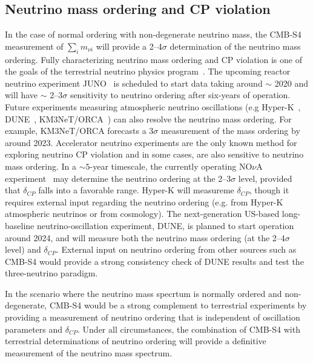 \subsection{Neutrino mass ordering and CP violation}
In the case of normal ordering with non-degenerate neutrino mass, the CMB-S4 measurement of $\sum_i m_{\nu i}$ will provide a 2--4$\sigma$ determination of the neutrino mass ordering. Fully characterizing neutrino mass ordering and CP violation is one of the goals of the terrestrial neutrino physics program~\cite{Patterson:2015xja}. The upcoming reactor neutrino experiment JUNO~\cite{An:2015jdp} is scheduled to start data taking around $\sim$ 2020 and will have $\sim$ 2--3$\sigma$ sensitivity to neutrino ordering after six-years of operation. Future experiments measuring atmospheric neutrino oscillations (e.g Hyper-K~\cite{Abe:2015zbg}, DUNE~\cite{Goodman:2015gmv}, KM3NeT/ORCA~\cite{Adrian-Martinez:2016fdl}) can also resolve the neutrino mass ordering. For example, KM3NeT/ORCA forecasts a 3$\sigma$ measurement of the mass ordering by around 2023. Accelerator neutrino experiments are the only known method for exploring neutrino CP violation and in some cases, are also sensitive to neutrino mass ordering. In a $\sim 5$-year timescale, the currently operating NO$\nu$A experiment~\cite{Adamson:2016tbq} may determine the neutrino ordering at the 2--3$\sigma$ level, provided that $\delta_{CP}$ falls into a favorable range. Hyper-K will measureme $\delta_{CP}$, though it requires external input regarding the neutrino ordering (e.g. from Hyper-K atmospheric neutrinos or from cosmology). The next-generation US-based long-baseline neutrino-oscillation experiment, DUNE, is planned to start operation around 2024, and will measure both the neutrino mass ordering (at the 2--4$\sigma$ level) and $\delta_{CP}$. External input on neutrino ordering from other sources such as CMB-S4 would provide a strong consistency check of DUNE results and test the three-neutrino paradigm.

In the scenario where the neutrino mass specrtum is normally ordered and non-degenerate, CMB-S4 would be a strong complement to terrestrial experiments by providing a measurement of neutrino ordering that is independent of oscillation parameters and $\delta_{CP}$. Under all circumstances, the combination of CMB-S4 with terrestrial determinations of neutrino ordering will provide a definitive measurement of the neutrino mass spectrum.



